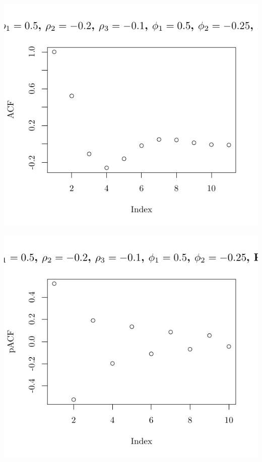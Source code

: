 \documentclass[10pt]{paper}\usepackage[]{graphicx}\usepackage[]{color}
\makeatletter
\def\maxwidth{ %
  \ifdim\Gin@nat@width>\linewidth
    \linewidth
  \else
    \Gin@nat@width
  \fi
}
\newenvironment{knitrout}{}{} %
\makeatother
\begin{document}
\begin{knitrout}
{\centering \includegraphics[width=\maxwidth]{figure/graphics-plotter-181} 

}




{\centering \includegraphics[width=\maxwidth]{figure/graphics-plotter-182} 

}





\end{knitrout}
\end{document}
